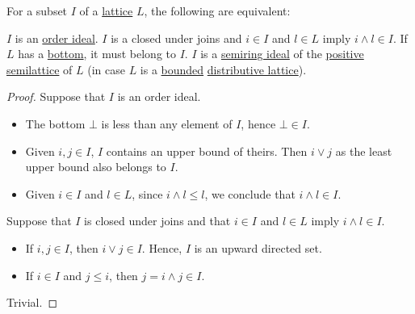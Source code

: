 \begin{proposition}\label{thm:lattice_ideals}
  For a subset \( I \) of a \hyperref[def:semilattice/lattice]{lattice} \( L \), the following are equivalent:
  \begin{thmenum}
     \( I \) is an \hyperref[def:order_ideal_and_filter]{order ideal}.
     \( I \) is a closed under joins and \( i \in I \) and \( l \in L \) imply \( i \wedge l \in I \). If \( L \) has a \hyperref[def:partially_ordered_set_extremal_points/top_and_bottom]{bottom}, it must belong to \( I \).
     \( I \) is a \hyperref[def:semiring_ideal]{semiring ideal} of the \hyperref[ex:def:semiring/lattice]{positive semilattice} of \( L \) (in case \( L \) is a \hyperref[def:semilattice/bounded]{bounded} \hyperref[def:semilattice/distributive_lattice]{distributive lattice}).
  \end{thmenum}
\end{proposition}
\begin{proof}
   Suppose that \( I \) is an order ideal.
  \begin{itemize}
    \item The bottom \( \bot \) is less than any element of \( I \), hence \( \bot \in I \).
    \item Given \( i, j \in I \), \( I \) contains an upper bound of theirs. Then \( i \vee j \) as the least upper bound also belongs to \( I \).
    \item Given \( i \in I \) and \( l \in L \), since \( i \wedge l \leq l \), we conclude that \( i \wedge l \in I \).
  \end{itemize}

   Suppose that \( I \) is closed under joins and that \( i \in I \) and \( l \in L \) imply \( i \wedge l \in I \).
  \begin{itemize}
    \item If \( i, j \in I \), then \( i \vee j \in I \). Hence, \( I \) is an upward directed set.
    \item If \( i \in I \) and \( j \leq i \), then \( j = i \wedge j \in I \).
  \end{itemize}

   Trivial.
\end{proof}

